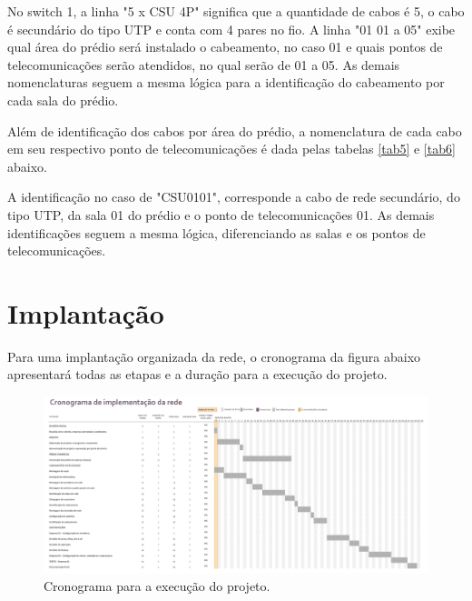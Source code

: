 \documentclass[	DIV=calc,%
							paper=a4,%
							fontsize=12pt,%
							onecolumn]{scrartcl}	 					%
\begin{document}
No switch 1, a linha "5 x CSU 4P" significa que a quantidade de cabos é 5, o cabo é secundário do tipo UTP e conta com 4 pares no fio. A linha "01 01 a 05" exibe qual área do prédio será instalado o cabeamento, no caso 01 e quais pontos de telecomunicações serão atendidos, no qual serão de 01 a 05. As demais nomenclaturas seguem a mesma lógica para a identificação do cabeamento por cada sala do prédio.

Além de identificação dos cabos por área do prédio, a nomenclatura de cada cabo em seu respectivo ponto de telecomunicações é dada pelas tabelas \ref{tab5} e \ref{tab6} abaixo.

\newpage


A identificação no caso de "CSU0101", corresponde a cabo de rede secundário, do tipo UTP, da sala 01 do prédio e o ponto de telecomunicações 01. As demais identificações seguem a mesma lógica, diferenciando as salas e os pontos de telecomunicações.



\section{Implantação}
Para uma implantação organizada da rede, o cronograma da figura abaixo apresentará todas as etapas e a duração para a execução do projeto.

\newpage
\begin{figure}[h!]
	\centering
	\includegraphics[height=\textwidth,angle=-90,scale=0.565]{crono}
	\caption{Cronograma para a execução do projeto.}
	\label{crono}
\end{figure}
\end{document}
